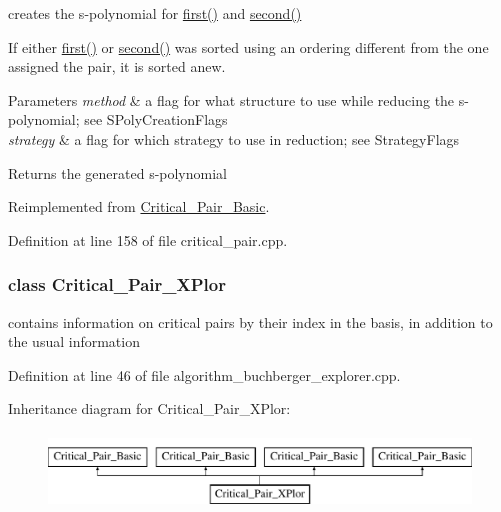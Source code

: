 creates the s-\/polynomial for \hyperlink{group___g_b_computation_a6e251e3724fde2c610d921f93889eb67}{first()} and \hyperlink{group___g_b_computation_a06da1cbbe1451962b68f2bbf90855fae}{second()} 

If either \hyperlink{group___g_b_computation_a6e251e3724fde2c610d921f93889eb67}{first()} or \hyperlink{group___g_b_computation_a06da1cbbe1451962b68f2bbf90855fae}{second()} was sorted using an ordering different from the one assigned the pair, it is sorted anew. 
\begin{DoxyParams}{Parameters}
{\em method} & a flag for what structure to use while reducing the s-\/polynomial; see S\+Poly\+Creation\+Flags \\
\hline
{\em strategy} & a flag for which strategy to use in reduction; see Strategy\+Flags \\
\hline
\end{DoxyParams}
\begin{DoxyReturn}{Returns}
the generated s-\/polynomial 
\end{DoxyReturn}


Reimplemented from \hyperlink{group___g_b_computation_aedcb486aa7298a6ed5a1980890df0780}{Critical\+\_\+\+Pair\+\_\+\+Basic}.



Definition at line 158 of file critical\+\_\+pair.\+cpp.

\label{class_critical___pair___x_plor}
\subsubsection{class Critical\+\_\+\+Pair\+\_\+\+X\+Plor}
contains information on critical pairs by their index in the basis, in addition to the usual information 

Definition at line 46 of file algorithm\+\_\+buchberger\+\_\+explorer.\+cpp.

Inheritance diagram for Critical\+\_\+\+Pair\+\_\+\+X\+Plor\+:\begin{figure}[H]
\begin{center}
\leavevmode
\includegraphics[height=2.000000cm]{group___g_b_computation}
\end{center}
\end{figure}
